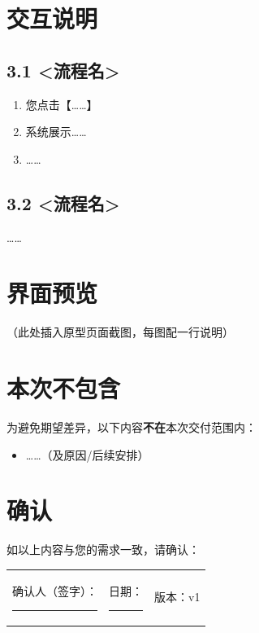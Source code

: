 \documentclass[12pt,a4paper]{ctexart}
\newcommand{\docversion}{v1}              %
\begin{document}
\section{交互说明}

\subsection*{3.1 <流程名>}
\begin{enumerate}
  \item 您点击【……】
  \item 系统展示……
  \item ……
\end{enumerate}

\subsection*{3.2 <流程名>}
……

\section{界面预览}

（此处插入原型页面截图，每图配一行说明）

\section{本次不包含}
为避免期望差异，以下内容\textbf{不在}本次交付范围内：
\begin{itemize}
  \item ……（及原因/后续安排）
\end{itemize}

\section{确认}
如以上内容与您的需求一致，请确认：
\vspace{1.5em}

\noindent
\begin{tabular}{p{5cm}p{5cm}p{4cm}}
确认人（签字）：\rule[-0.2cm]{3cm}{0.4pt} & 日期：\rule[-0.2cm]{2.5cm}{0.4pt} & 版本：\docversion \\
\end{tabular}
\end{document}
